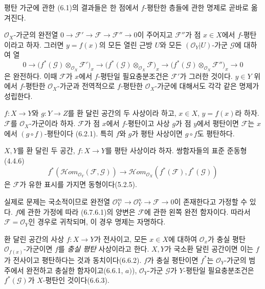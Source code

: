 \begin{env}[6.7.4]
\label{0.6.7.4-ko}
평탄 가군에 관한 (6.1)의 결과들은 한 점에서 $f$-평탄한 층들에
관한 명제로 곧바로 옮겨진다.

$\mathcal O_X$-가군의 완전열
$0\to\mathcal F'\to\mathcal F\to\mathcal F''\to0$이 주어지고
$\mathcal F''$가 점 $x\in X$에서 $f$-평탄이라고 하자.
그러면 $y=f(x)$의 모든 열린 근방 $U$와 모든
$(\mathcal O_Y|U)$-가군 $\mathcal G$에 대하여 열
\[
  0\longrightarrow
  \bigl(f^*(\mathcal G)\otimes_{\mathcal O_X}\mathcal F'\bigr)_x
  \longrightarrow
  \bigl(f^*(\mathcal G)\otimes_{\mathcal O_X}\mathcal F\bigr)_x
  \longrightarrow
  \bigl(f^*(\mathcal G)\otimes_{\mathcal O_X}\mathcal F''\bigr)_x
  \longrightarrow0
\]
은 완전하다. 이때 $\mathcal F$가 $x$에서 $f$-평탄일
필요충분조건은 $\mathcal F'$가 그러한 것이다. $y\in Y$ 위에서
$f$-평탄한 $\mathcal O_X$-가군과 전역적으로 $f$-평탄한
$\mathcal O_X$-가군에 대해서도 각각 같은 명제가 성립한다.
\end{env}

\begin{env}[6.7.5]
\label{0.6.7.5-ko}
$f:X\to Y$와 $g:Y\to Z$를 환 달린 공간의 두 사상이라 하고,
$x\in X$, $y=f(x)$라 하자. $\mathcal F$를 $\mathcal O_X$-가군이라
하자. $\mathcal F$가 점 $x$에서 $f$-평탄이고 사상 $g$가 점
$y$에서 평탄이면 $\mathcal F$는 $x$에서 $(g\circ f)$-평탄이다
(6.2.1). 특히 $f$와 $g$가 평탄 사상이면 $g\circ f$도 평탄하다.
\end{env}

\begin{env}[6.7.6]
\label{0.6.7.6-ko}
$X,Y$를 환 달린 두 공간, $f:X\to Y$를 평탄 사상이라 하자.
쌍함자들의 표준 준동형(4.4.6)
\[
  f^*(\mathcal{H}om_{\mathcal O_Y}(\mathcal F,\mathcal G))
  \longrightarrow
  \mathcal{H}om_{\mathcal O_X}(f^*(\mathcal F),f^*(\mathcal G))
  \tag{6.7.6.1}
  \label{0.6.7.6.1-ko}
\]
은 $\mathcal F$가 유한 표시를 가지면 동형이다(5.2.5).

실제로 문제는 국소적이므로 완전열
$\mathcal O_Y^m\to\mathcal O_Y^n\to\mathcal F\to0$이 존재한다고
가정할 수 있다. $f$에 관한 가정에 따라 (6.7.6.1)의 양변은
$\mathcal F$에 관한 왼쪽 완전 함자이다. 따라서
$\mathcal F=\mathcal O_Y$인 경우로 귀착되며, 이 경우 명제는
자명하다.
\end{env}

\begin{env}[6.7.8]
\label{0.6.7.8-ko}
환 달린 공간의 사상 $f:X\to Y$가 전사이고, 모든 $x\in X$에
대하여 $\mathcal O_x$가 충실 평탄 $\mathcal O_{f(x)}$-가군이면
$f$를 \emph{충실 평탄} 사상이라고 한다. $X,Y$가 국소환 달린
공간이면 이는 $f$가 전사이고 평탄하다는 것과 동치이다(6.6.2).
$f$가 충실 평탄이면 $f^*$는 $\mathcal O_Y$-가군의 범주에서
완전하고 충실한 함자이고(6.6.1, $a)$), $\mathcal O_Y$-가군
$\mathcal G$가 $Y$-평탄일 필요충분조건은 $f^*(\mathcal G)$가
$X$-평탄인 것이다(6.6.3).
\end{env}

